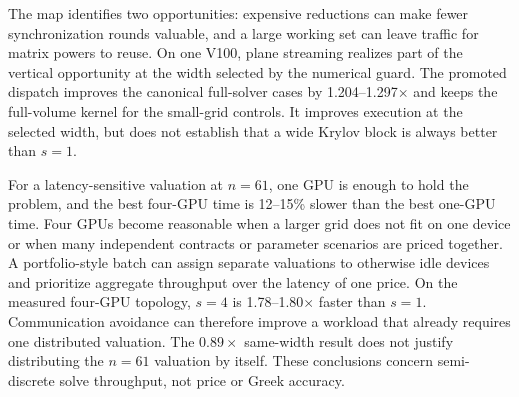 The map identifies two opportunities: expensive reductions can make fewer synchronization rounds valuable, and a large working set can leave traffic for matrix powers to reuse. On one V100, plane streaming realizes part of the vertical opportunity at the width selected by the numerical guard. The promoted dispatch improves the canonical full-solver cases by 1.204--1.297$\times$ and keeps the full-volume kernel for the small-grid controls. It improves execution at the selected width, but does not establish that a wide Krylov block is always better than $s=1$.

For a latency-sensitive valuation at $n=61$, one GPU is enough to hold the problem, and the best four-GPU time is 12--15\% slower than the best one-GPU time. Four GPUs become reasonable when a larger grid does not fit on one device or when many independent contracts or parameter scenarios are priced together. A portfolio-style batch can assign separate valuations to otherwise idle devices and prioritize aggregate throughput over the latency of one price. On the measured four-GPU topology, $s=4$ is 1.78--1.80$\times$ faster than $s=1$. Communication avoidance can therefore improve a workload that already requires one distributed valuation. The $0.89\times$ same-width result does not justify distributing the $n=61$ valuation by itself. These conclusions concern semi-discrete solve throughput, not price or Greek accuracy.
